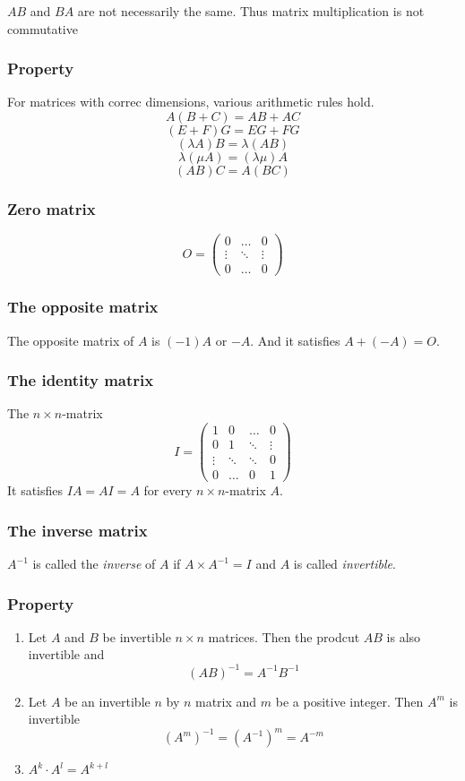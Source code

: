 \begin{nb}
    $AB$ and $BA$ are not necessarily the same. Thus matrix multiplication is not commutative
\end{nb}

\subsubsection{Property}
For matrices with correc dimensions, various arithmetic rules hold.
$$ A(B+C) = AB + AC $$
$$ (E+F)G = EG + FG $$
$$ (\lambda A)B = \lambda (AB) $$
$$ \lambda (\mu A) = (\lambda\mu) A $$
$$ (AB)C = A(BC) $$

\subsubsection{Zero matrix}
$$ O = \begin{pmatrix}
    0 & \dots & 0 \\
    \vdots & \ddots & \vdots \\
    0 & \dots & 0
\end{pmatrix} $$

\subsubsection{The opposite matrix}
The opposite matrix of $A$ is $(-1)A$ or $-A$. And it satisfies $A + (-A) = O$.

\subsubsection{The identity matrix}
The $n \times n$-matrix
$$ I = \begin{pmatrix}
    1 & 0 & \dots & 0 \\
    0 & 1 & \ddots & \vdots \\
    \vdots & \ddots & \ddots & 0 \\
    0 & \dots & 0 & 1
\end{pmatrix} $$
It satisfies $IA = AI = A$ for every $n \times n$-matrix $A$.

\subsubsection{The inverse matrix}
$A^{-1}$ is called the \emph{inverse} of $A$ if $A \times A^{-1} = I$ and $A$ is called \emph{invertible}.

\subsubsection{Property}
\begin{enumerate}
    \item Let $A$ and $B$ be invertible $n \times n$ matrices. Then the prodcut $AB$ is also invertible and
$$ (AB)^{-1} = A^{-1}B^{-1} $$
    \item Let $A$ be an invertible $n$ by $n$ matrix and $m$ be a positive integer. Then $A^m$ is invertible
    $$ (A^m)^{-1}  = (A^{-1})^m = A^{-m} $$
    \item $A^k\cdot A^l = A^{k+l}$
\end{enumerate}

